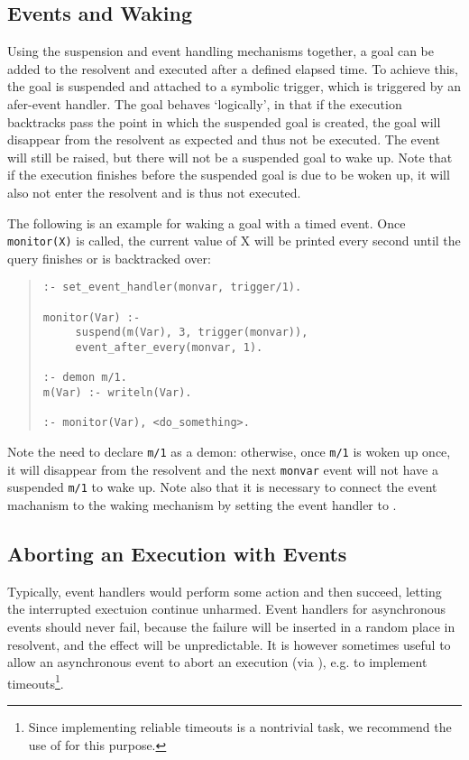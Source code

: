 \subsection{Events and Waking}

Using the suspension and event handling mechanisms together, a goal can be
added to the resolvent and executed after a defined elapsed time.
To achieve this, the goal is suspended and attached to a symbolic
trigger, which is triggered by an afer-event handler.  The goal behaves
`logically', in that if the execution backtracks pass the point in which
the suspended goal is created, the goal will disappear from the resolvent
as expected and thus not be executed. The event will still be raised, but
there will not be a suspended goal to wake up. Note that if the execution
finishes before the suspended goal is due to be woken up, it will also not
enter the resolvent and is thus not executed.

The following is an example for waking a goal with a timed event.
Once \verb+monitor(X)+ is called, the current value of X will be
printed every second until the query finishes or is backtracked over:
\begin{quote}\begin{verbatim}
:- set_event_handler(monvar, trigger/1).

monitor(Var) :-
     suspend(m(Var), 3, trigger(monvar)),
     event_after_every(monvar, 1).

:- demon m/1.
m(Var) :- writeln(Var).

:- monitor(Var), <do_something>.
\end{verbatim}\end{quote}
Note the need to declare
\verb'm/1' as a demon: otherwise, once \verb'm/1' is woken up once, it will
disappear from the resolvent and the next \verb'monvar' event will not have
a suspended \verb'm/1' to wake up.
Note also that it is necessary to connect the event machanism to
the waking mechanism by setting the event handler to .


\subsection{Aborting an Execution with Events}

Typically, event handlers would perform some action and then succeed,
letting the interrupted exectuion continue unharmed. Event handlers for
asynchronous events should never fail, because the failure will be inserted
in a random place in resolvent, and the effect will be unpredictable.
It is however sometimes useful to allow an asynchronous event to abort
an execution (via 
), e.g.
to implement timeouts\footnote{Since implementing reliable timeouts is a
nontrivial task, we recommend the use of
 for this purpose.}.


